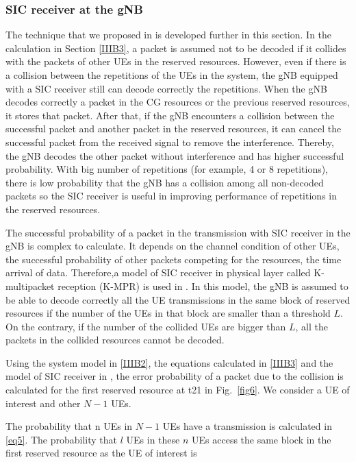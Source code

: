 \documentclass{ieeeaccess}
\begin{document}
\subsubsection{SIC receiver at the gNB}

The technique that we proposed in \cite{b9} is developed further in this section. In the calculation in Section \ref{IIIB3}, a packet is assumed not to be decoded if it collides with the packets of other UEs in the reserved resources. However, even if there is a collision between the repetitions of the UEs in the system, the gNB equipped with a SIC receiver still can decode correctly the repetitions. When the gNB decodes correctly a packet in the CG resources or the previous reserved resources, it stores that packet. After that, if the gNB encounters a collision between the successful packet and another packet in the reserved resources, it can cancel the successful packet from the received signal to remove the interference. Thereby, the gNB decodes the other packet without interference and has higher successful probability. With big number of repetitions (for example, 4 or  8 repetitions), there is low probability that the gNB has a collision among all non-decoded packets so the SIC receiver is useful in improving performance of repetitions in the reserved resources.

The successful probability of a packet in the transmission with SIC receiver in the gNB is complex to calculate. It depends on the channel condition of other UEs, the successful probability of other packets competing for the resources, the time arrival of data. Therefore,a model of SIC receiver in physical layer called K-multipacket reception (K-MPR) is used in \cite{ref21}. In this model, the gNB is assumed to be able to decode correctly all the UE transmissions in the same block of reserved resources if the number of the UEs in that block are smaller than a threshold $L$. On the contrary, if the number of the collided UEs are bigger than $L$, all the packets in the collided resources cannot be decoded.

Using the system model in \ref{IIIB2}, the equations calculated in \ref{IIIB3} and the model of SIC receiver in \cite{ref21} , the error probability of a packet due to the collision is calculated for the first reserved resource at t21 in Fig.~\ref{fig6}. We consider a UE of interest and other $N-1$ UEs.

The probability that n UEs in $N-1$ UEs have a transmission is calculated in \eqref{eq5}. The probability that $l$ UEs in these $n$ UEs access the same block in the first reserved resource as the UE of interest is
\end{document}
